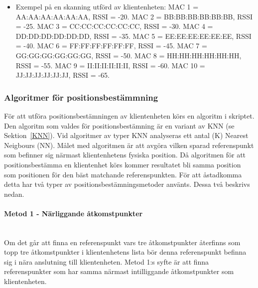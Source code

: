 \documentclass[a4paper,12pt]{article}
\begin{document}
   \begin{itemize}
   \item Exempel på en skanning utförd av klientenheten:
         \newline MAC 1 = AA:AA:AA:AA:AA:AA,  RSSI = -20.
         \newline MAC 2 = BB:BB:BB:BB:BB:BB,  RSSI = -25.
         \newline MAC 3 = CC:CC:CC:CC:CC:CC,  RSSI = -30.
         \newline MAC 4 = DD:DD:DD:DD:DD:DD,  RSSI = -35.
         \newline MAC 5 = EE:EE:EE:EE:EE:EE,  RSSI = -40.
         \newline MAC 6 = FF:FF:FF:FF:FF:FF,  RSSI = -45.
         \newline MAC 7 = GG:GG:GG:GG:GG:GG,  RSSI = -50.
         \newline MAC 8 = HH:HH:HH:HH:HH:HH,  RSSI = -55.
         \newline MAC 9 = II:II:II:II:II:II,  RSSI = -60.
         \newline MAC 10 = JJ:JJ:JJ:JJ:JJ:JJ,  RSSI = -65.
   \end{itemize}

 \subsubsection{Algoritmer för positionsbestämmning}\label{algoritm}
 För att utföra positionsbestämningen av klientenheten körs en algoritm i skriptet. Den algoritm som valdes för positionsbestämning är en variant av KNN (se Sektion~\ref{KNN}). Vid algoritmer av typer KNN analyseras ett antal (K) Nearest Neigbours (NN).
 Målet med algoritmen är att avgöra vilken sparad referenspunkt som befinner sig närmast klientenhetens fysiska position. Då algoritmen för att positionsbestämma en klientenhet körs kommer resultatet bli samma position som positionen för den bäst matchande referenspunkten. För att åstadkomma detta har två typer av positionsbestämningsmetoder använts. Dessa två beskrivs nedan.

 \paragraph{Metod 1 - Närliggande åtkomstpunkter}
 \leavevmode\\
 Om det går att finna en referenspunkt vars tre åtkomstpunkter återfinns som topp tre åtkomstpunkter i klientenhetens lista bör denna referenspunkt befinna sig i nära anslutning till klientenheten.
 Metod 1:s syfte är att finna referenspunkter som har samma närmast intilliggande åtkomstpunkter som klientenheten.
\end{document}
